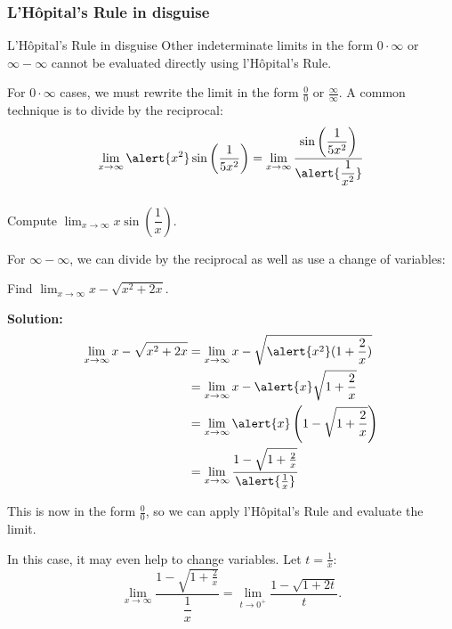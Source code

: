 \documentclass[cal1spr16Lectures.tex]{subfiles}
\begin{document}
\subsubsection{L'H\^opital's Rule in disguise}

\begin{frame}{\small L'H\^opital's Rule in disguise}
\small
Other indeterminate limits in the form $0 \cdot \infty$ or $\infty - \infty$ cannot be evaluated directly using l'H\^{o}pital's Rule.

\vspace{1pc}
For $0 \cdot \infty$ cases, we must rewrite the limit in the form $\frac{0}{0}$ or $\frac{\infty}{\infty}$.  A common technique is to divide by the reciprocal:
\[\lim_{x \to \infty} \alert{x^2} \sin \left( \frac{1}{5x^2} \right) = \lim_{x \to \infty} \frac{\sin \left( \dfrac{1}{5x^2} \right)}{\alert{\dfrac{1}{x^2}}}\]
\end{frame}

\begin{frame}%
\frametitle{}
\small
\begin{exe} Compute $\displaystyle\lim_{x \to \infty} x \sin \left( \dfrac{1}{x} \right).$ \end{exe}
\end{frame}

\begin{frame}
\footnotesize
For $\infty - \infty$, we can divide by the reciprocal as well as use a change of variables:
\begin{ex} Find $\displaystyle\lim_{x \to \infty} x-\sqrt{x^2+2x}$. \end{ex}
{\bf Solution:}
\vspace{-1.5pc}
\begin{alignat*}{2}
\lim_{x \to \infty} x-\sqrt{x^2+2x} &= \lim_{x \to \infty} x-\sqrt{\alert{x^2}(1+\frac{2}{x})} \\%
&=\lim_{x \to \infty} x-\alert{x}\sqrt{1+\frac{2}{x}} \\
&= \lim_{x \to \infty} \alert{x} \left( 1-\sqrt{1+\frac{2}{x}} \right) \\
&= \lim_{x \to \infty} \frac{ 1-\sqrt{1+\frac{2}{x}} }{\alert{\frac{1}{x}} }
\end{alignat*}
\end{frame}

\begin{frame}
\small
This is now in the form $\frac{0}{0}$, so we can apply l'H\^{o}pital's Rule and evaluate the limit.  

\vspace{1pc} 
In this case, it may even help to change variables.  Let $t=\frac{1}{x}$:
\[\lim_{x \to \infty} \frac{ 1-\sqrt{1+\frac{2}{x}} }{\dfrac{1}{x} } = \lim_{t \to 0^+} \frac{1-\sqrt{1+2t}}{t}.\]
\end{frame}
\end{document}
